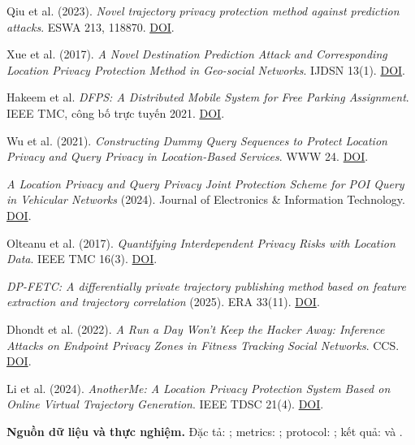 \documentclass[10pt,a4paper]{article}
\begin{document}
\begin{enumerate}[label={[\arabic*]},leftmargin=2em,itemsep=6pt]
\item Qiu et al. (2023). \emph{Novel trajectory privacy protection method against prediction attacks}. ESWA 213, 118870. \href{https://doi.org/10.1016/j.eswa.2022.118870}{DOI}.
\item Xue et al. (2017). \emph{A Novel Destination Prediction Attack and Corresponding Location Privacy Protection Method in Geo-social Networks}. IJDSN 13(1). \href{https://doi.org/10.1177/1550147716685421}{DOI}.
\item Hakeem et al. \emph{DFPS: A Distributed Mobile System for Free Parking Assignment}. IEEE TMC, công bố trực tuyến 2021. \href{https://doi.org/10.1109/TMC.2021.3080222}{DOI}.
\item Wu et al. (2021). \emph{Constructing Dummy Query Sequences to Protect Location Privacy and Query Privacy in Location-Based Services}. WWW 24. \href{https://doi.org/10.1007/s11280-020-00830-x}{DOI}.
\item \emph{A Location Privacy and Query Privacy Joint Protection Scheme for POI Query in Vehicular Networks} (2024). Journal of Electronics \& Information Technology. \href{https://doi.org/10.11999/JEIT221599}{DOI}.
\item Olteanu et al. (2017). \emph{Quantifying Interdependent Privacy Risks with Location Data}. IEEE TMC 16(3). \href{https://doi.org/10.1109/TMC.2016.2561281}{DOI}.
\item \emph{DP-FETC: A differentially private trajectory publishing method based on feature extraction and trajectory correlation} (2025). ERA 33(11). \href{https://doi.org/10.3934/era.2025293}{DOI}.
\item Dhondt et al. (2022). \emph{A Run a Day Won't Keep the Hacker Away: Inference Attacks on Endpoint Privacy Zones in Fitness Tracking Social Networks}. CCS. \href{https://doi.org/10.1145/3548606.3560616}{DOI}.
\item Li et al. (2024). \emph{AnotherMe: A Location Privacy Protection System Based on Online Virtual Trajectory Generation}. IEEE TDSC 21(4). \href{https://doi.org/10.1109/TDSC.2023.3314200}{DOI}.
\end{enumerate}
\textbf{Nguồn dữ liệu và thực nghiệm.} Đặc tả: ; metrics: ; protocol: ; kết quả:  và .
\end{document}
